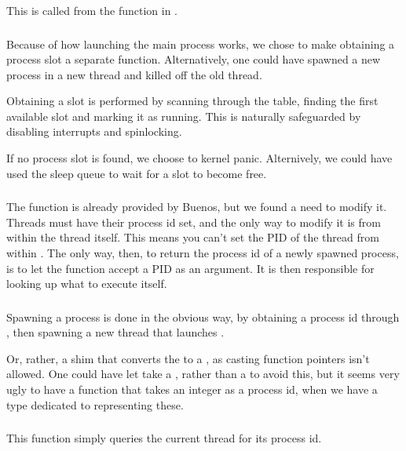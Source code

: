 This is called from the  function in .

\subsubsection{}
Because of how launching the main process works, we chose to make obtaining a
process slot a separate function. Alternatively, one could have spawned a new
process in a new thread and killed off the old thread.

Obtaining a slot is performed by scanning through the table, finding the first
available slot and marking it as running. This is naturally safeguarded by
disabling interrupts and spinlocking.

If no process slot is found, we choose to kernel panic. Alternively, we could have
used the sleep queue to wait for a slot to become free.

\subsubsection{}
The  function is already provided by Buenos, but we found a need to
modify it. Threads must have their process id set, and the only way to modify it
is from within the thread itself. This means you can't set the PID of the thread
from within . The only way, then, to return the process id of
a newly spawned process, is to let the  function accept a PID
as an argument. It is then responsible for looking up what to execute itself.

\subsubsection{}
Spawning a process is done in the obvious way, by obtaining a process id
through , then spawning a new thread that launches
.

Or, rather, a shim that converts the  to a ,
as casting function pointers isn't allowed. One could have let 
take a , rather than a  to avoid this, but
it seems very ugly to have a function that takes an integer as a process id, when
we have a type dedicated to representing these.

\subsubsection{}
This function simply queries the current thread for its process id.

